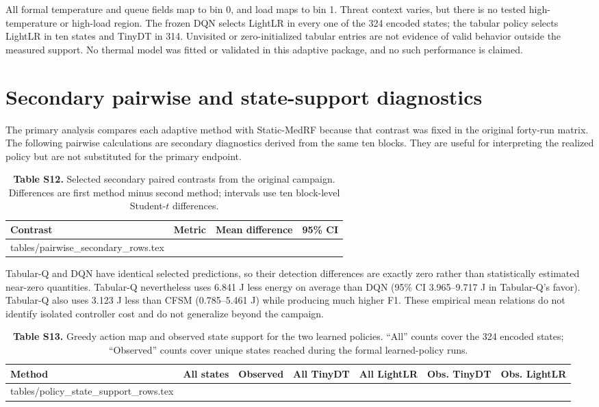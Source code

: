 \documentclass[10pt,a4paper]{article}
\makeatletter
\newcommand{\tableinput}[1]{\@@input #1.tex }
\makeatother
\begin{document}
All formal temperature and queue fields map to bin 0, and load maps to bin 1. Threat context varies, but there is no tested high-temperature or high-load region. The frozen DQN selects LightLR in every one of the 324 encoded states; the tabular policy selects LightLR in ten states and TinyDT in 314. Unvisited or zero-initialized tabular entries are not evidence of valid behavior outside the measured support. No thermal model was fitted or validated in this adaptive package, and no such performance is claimed.

\clearpage
\section{Secondary pairwise and state-support diagnostics}
The primary analysis compares each adaptive method with Static-MedRF because that contrast was fixed in the original forty-run matrix. The following pairwise calculations are secondary diagnostics derived from the same ten blocks. They are useful for interpreting the realized policy but are not substituted for the primary endpoint.

\begin{table}[h!]
\centering\small
\caption*{\textbf{Table S12.} Selected secondary paired contrasts from the original campaign. Differences are first method minus second method; intervals use ten block-level Student-$t$ differences.}
\begin{tabular}{llrr}\toprule
Contrast & Metric & Mean difference & 95\% CI\\\midrule
\tableinput{tables/pairwise_secondary_rows}
\bottomrule\end{tabular}
\end{table}

Tabular-Q and DQN have identical selected predictions, so their detection differences are exactly zero rather than statistically estimated near-zero quantities. Tabular-Q nevertheless uses 6.841 J less energy on average than DQN (95\% CI 3.965--9.717 J in Tabular-Q's favor). Tabular-Q also uses 3.123 J less than CFSM (0.785--5.461 J) while producing much higher F1. These empirical mean relations do not identify isolated controller cost and do not generalize beyond the campaign.

\begin{table}[h!]
\centering\small
\caption*{\textbf{Table S13.} Greedy action map and observed state support for the two learned policies. ``All'' counts cover the 324 encoded states; ``Observed'' counts cover unique states reached during the formal learned-policy runs.}
\begin{tabular}{lrrrrrr}\toprule
Method & All states & Observed & All TinyDT & All LightLR & Obs. TinyDT & Obs. LightLR\\\midrule
\tableinput{tables/policy_state_support_rows}
\bottomrule\end{tabular}
\end{table}
\end{document}
